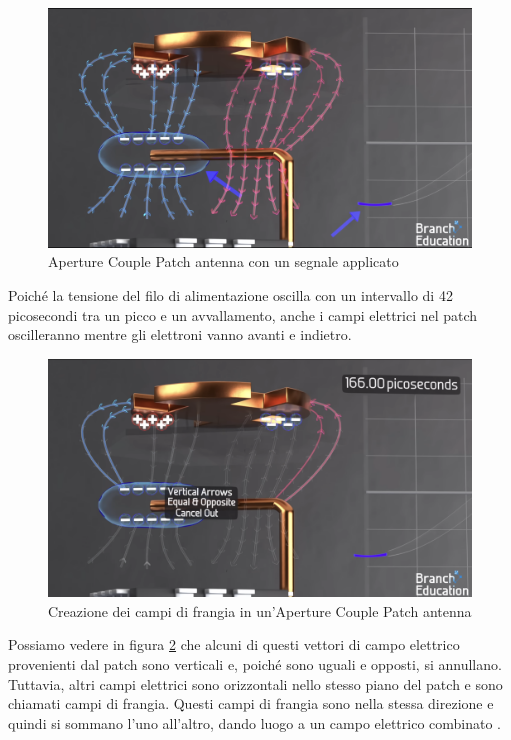 \begin{figure}[htbp]
  \centering
  \includegraphics[width=0.8\linewidth]{./res/img/antenna_voltage_applied.png}
  \caption{Aperture Couple Patch antenna con un segnale applicato \cite{branch_education_how_2022}}
  \label{fig:aperture-couple-patch-antenna-voltage-applied}
\end{figure}

Poiché la tensione del filo di alimentazione oscilla con un intervallo di 42 picosecondi tra un picco e un avvallamento, anche i campi elettrici nel patch oscilleranno mentre gli elettroni vanno avanti e indietro.

\begin{figure}[htbp]
  \centering
  \includegraphics[width=0.8\linewidth]{./res/img/antenna_fringing_fields.png}
  \caption{Creazione dei campi di frangia in un'Aperture Couple Patch antenna \cite{branch_education_how_2022}}
  \label{fig:aperture-couple-patch-antenna-fringing-fields}
\end{figure}

Possiamo vedere in figura \ref{fig:aperture-couple-patch-antenna-fringing-fields} che alcuni di questi vettori di campo elettrico provenienti dal patch sono verticali e, poiché sono uguali e opposti, si annullano.
Tuttavia, altri campi elettrici sono orizzontali nello stesso piano del patch e sono chiamati campi di frangia.
Questi campi di frangia sono nella stessa direzione e quindi si sommano l'uno all'altro, dando luogo a un campo elettrico combinato \cite{branch_education_how_2022}.

